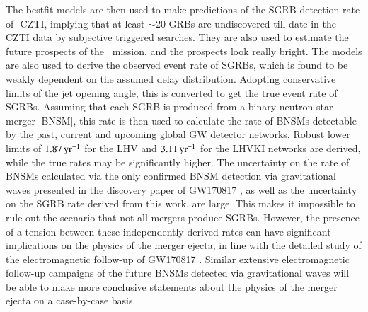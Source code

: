 The bestfit models are then used to make predictions of the SGRB detection rate of \AS -CZTI, implying that at least $\sim 20$ GRBs are undiscovered till date in the CZTI data by subjective triggered searches. They are also used to estimate the future prospects of the \D\ mission, and the prospects look really bright. The models are also used to derive the observed event rate of SGRBs, which is found to be weakly dependent on the assumed delay distribution. Adopting conservative limits of the jet opening angle, this is converted to get the true event rate of SGRBs. Assuming that each SGRB is produced from a binary neutron star merger [BNSM], this rate is then used to calculate the rate of BNSMs detectable by the past, current and upcoming global GW detector networks. Robust lower limits of $1.87 \, {\rm yr^{-1}}$ for the LHV and $3.11 \, {\rm yr^{-1}}$ for the LHVKI networks are derived, while the true rates may be significantly higher. The uncertainty on the rate of BNSMs calculated via the only confirmed BNSM detection via gravitational waves presented in the discovery paper of GW170817 \citep{GW170817-2017}, as well as the uncertainty on the SGRB rate derived from this work, are large. This makes it impossible to rule out the scenario that not all mergers produce SGRBs. However, the presence of a tension between these independently derived rates can have significant implications on the physics of the merger ejecta, in line with the detailed study of the electromagnetic follow-up of GW170817 \citep{Kasliwal_et_al.-2017-Science}. Similar extensive electromagnetic follow-up campaigns of the future BNSMs detected via gravitational waves will be able to make more conclusive statements about the physics of the merger ejecta on a case-by-case basis.
